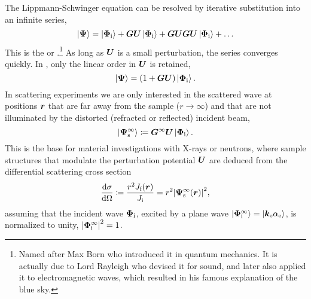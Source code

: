 The Lippmann-Schwinger equation can be resolved by iterative substitution
into an infinite series,
\begin{equation}\label{EBornSeries}
  \ket{\v\Psi}
  = \ket{\v\Phi_\si}
  + \TG\TU \ket{\v\Phi_\si}
  + \TG\TU \TG\TU  \ket{\v\Phi_\si}
 + \ldots
\end{equation}
%
%
This is the  or .\footnote
{Named after Max Born who introduced it in quantum mechanics.
It is actually due to Lord Rayleigh who devised it for sound,
and later also applied it to electromagnetic waves,
which resulted in his famous explanation of the blue sky.}
As long as $\bm{U}$ is a small perturbation, the series converges quickly.
In ,
%
only the linear order in $\bm{U}$ is retained,
\begin{equation}\label{EBorn1}
  \ket{\v\Psi}
  = (1 + \TG\TU) \ket{\v\Phi_\si}.
\end{equation}
In scattering experiments we are only interested in the scattered
wave at positions $\bm{r}$ that are far away from the sample ($r\to\infty$)
and that are not illuminated by the distorted (refracted or reflected) incident beam,
%
%
\begin{equation}\label{EBornS}
  \ket{\v\Psi^\infty_\text{s}}
  \coloneqq \TG^\infty\TU\ket{\v\Phi_\si}.
\end{equation}
%
%
This is the base for material investigations with X-rays or neutrons,
where sample structures that modulate the perturbation potential $\bm{U}$
are deduced from the differential scattering cross section
%
%
%
%
%
%
\begin{equation}\label{Exsectiondef}
  \xElas
  \coloneqq  \frac{r^2 J_\sf(\r)}{J_\si}
  = r^2 {|\v\Psi^\infty_\text{s}(\r)|}^2,
\end{equation}
%
%
assuming that the incident wave $\bm{\Phi}_{\text{i}}$, excited
by a plane wave $\ket{\bm{\Phi}^\infty_{\text{i}}}=\ket{{\bm{k}}_{\text{e}}\alpha_{\text{e}}}$,
is normalized to unity, ${|\bm{\Phi}^\infty_{\text{i}}|}^2=1$.

